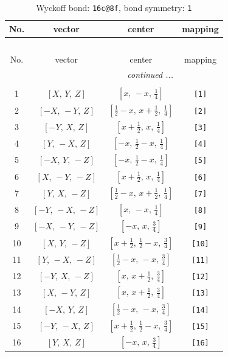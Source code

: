 \documentclass[fleqn,8pt]{jsarticle}
\begin{document}
\begin{longtable}{cccc}
\caption{Wyckoff bond: {\tt 16c@8f}, bond symmetry: {\tt 1}}
 \\
 \hline \hline
No. & vector & center & mapping \\ \hline \endfirsthead

\multicolumn{3}{l}{\tablename\ \thetable{}} \\
 \hline \hline
No. & vector & center & mapping \\ \hline \endhead

 \hline \hline
\multicolumn{3}{r}{\footnotesize\it continued ...} \\ \endfoot

 \hline \hline
\multicolumn{3}{r}{} \\ \endlastfoot

1 & $\left[ X,\, Y,\, Z \right]$ & $\left[ x,\, - x,\, \frac{1}{4} \right]$ & {\tt [1]} \\ \hline
2 & $\left[ - X,\, - Y,\, Z \right]$ & $\left[ \frac{1}{2} - x,\, x + \frac{1}{2},\, \frac{1}{4} \right]$ & {\tt [2]} \\ \hline
3 & $\left[ - Y,\, X,\, Z \right]$ & $\left[ x + \frac{1}{2},\, x,\, \frac{1}{4} \right]$ & {\tt [3]} \\ \hline
4 & $\left[ Y,\, - X,\, Z \right]$ & $\left[ - x,\, \frac{1}{2} - x,\, \frac{1}{4} \right]$ & {\tt [4]} \\ \hline
5 & $\left[ - X,\, Y,\, - Z \right]$ & $\left[ - x,\, \frac{1}{2} - x,\, \frac{1}{4} \right]$ & {\tt [5]} \\ \hline
6 & $\left[ X,\, - Y,\, - Z \right]$ & $\left[ x + \frac{1}{2},\, x,\, \frac{1}{4} \right]$ & {\tt [6]} \\ \hline
7 & $\left[ Y,\, X,\, - Z \right]$ & $\left[ \frac{1}{2} - x,\, x + \frac{1}{2},\, \frac{1}{4} \right]$ & {\tt [7]} \\ \hline
8 & $\left[ - Y,\, - X,\, - Z \right]$ & $\left[ x,\, - x,\, \frac{1}{4} \right]$ & {\tt [8]} \\ \hline
9 & $\left[ - X,\, - Y,\, - Z \right]$ & $\left[ - x,\, x,\, \frac{3}{4} \right]$ & {\tt [9]} \\ \hline
10 & $\left[ X,\, Y,\, - Z \right]$ & $\left[ x + \frac{1}{2},\, \frac{1}{2} - x,\, \frac{3}{4} \right]$ & {\tt [10]} \\ \hline
11 & $\left[ Y,\, - X,\, - Z \right]$ & $\left[ \frac{1}{2} - x,\, - x,\, \frac{3}{4} \right]$ & {\tt [11]} \\ \hline
12 & $\left[ - Y,\, X,\, - Z \right]$ & $\left[ x,\, x + \frac{1}{2},\, \frac{3}{4} \right]$ & {\tt [12]} \\ \hline
13 & $\left[ X,\, - Y,\, Z \right]$ & $\left[ x,\, x + \frac{1}{2},\, \frac{3}{4} \right]$ & {\tt [13]} \\ \hline
14 & $\left[ - X,\, Y,\, Z \right]$ & $\left[ \frac{1}{2} - x,\, - x,\, \frac{3}{4} \right]$ & {\tt [14]} \\ \hline
15 & $\left[ - Y,\, - X,\, Z \right]$ & $\left[ x + \frac{1}{2},\, \frac{1}{2} - x,\, \frac{3}{4} \right]$ & {\tt [15]} \\ \hline
16 & $\left[ Y,\, X,\, Z \right]$ & $\left[ - x,\, x,\, \frac{3}{4} \right]$ & {\tt [16]} \\
\end{longtable}
\end{document}
